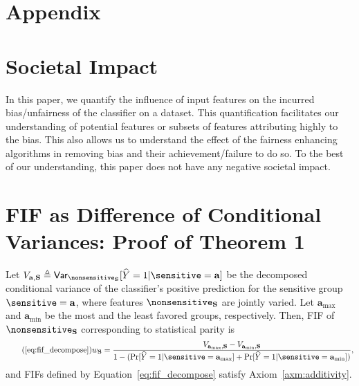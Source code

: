 \appendix
\section*{Appendix}
\section{Societal Impact}
In this paper, we quantify the influence of input features on the incurred bias/unfairness of the classifier on a dataset. This quantification facilitates our understanding of potential features or subsets of features attributing highly to the bias. This also allows us to understand the effect of the fairness enhancing algorithms in removing bias and their achievement/failure to do so. To the best of our understanding, this paper does not have any negative societal impact. 

\section{FIF as Difference of Conditional Variances: Proof of Theorem 1}\label{sec:proof_1}

\begin{theoremrep}
	\label{lemma:fif_rep}
	Let $ V_{\mathbf{a}, \mathbf{S}} \triangleq \mathsf{Var}_{\nonsensitive_{\mathbf{S}}}[\widehat{Y} = 1|\sensitive = \mathbf{a}] $ be the decomposed conditional variance of the classifier's positive prediction for the sensitive group $ \sensitive = \mathbf{a} $, where features $ \nonsensitive_{\mathbf{S}} $ are jointly varied. Let $\mathbf{a}_{\max}$ and $\mathbf{a}_{\min}$ be the most and the least favored groups, respectively. Then, FIF of $ \nonsensitive_{\mathbf{S}} $ corresponding to statistical parity is
	\begin{equation}\tag{\ref{eq:fif_decompose}}
	w_{\mathbf{S}}  = \frac{V_{\mathbf{a}_{\max},\mathbf{S}} - V_{\mathbf{a}_{\min},\mathbf{S}}}{1 - (\Pr[\widehat{Y} = 1 |  \sensitive = \mathbf{a}_{\max}] + \Pr[\widehat{Y} = 1 |  \sensitive = \mathbf{a}_{\min}])},
	\end{equation}
	and FIFs defined by Equation~\eqref{eq:fif_decompose} satisfy Axiom~\ref{axm:additivity}.
\end{theoremrep}



